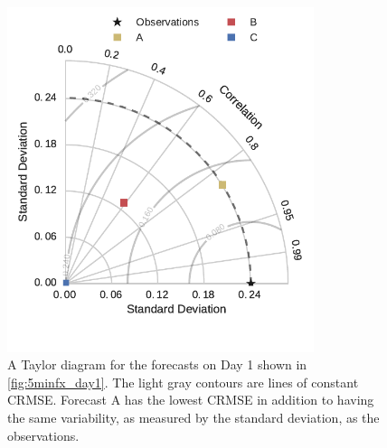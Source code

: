 \begin{figure}[p]
\centering
\includegraphics[width=0.8\textwidth]{figs/taylor_Day_1.pdf}
\vspace{-3em}
\caption[Taylor diagram for day 1 example forecasts]{A Taylor diagram
  for the forecasts on Day 1 shown in \cref{fig:5minfx_day1}. The
  light gray contours are lines of constant CRMSE. Forecast A has the
  lowest CRMSE in addition to having the same variability, as measured
  by the standard deviation, as the observations.}
\label{fig:taylor_day1}
\end{figure}

